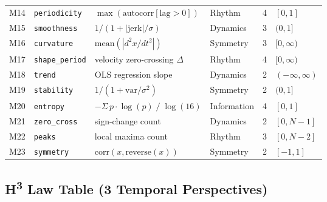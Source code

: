 \begin{longtable}{
  r
  l
  l
  l
  r
  l
}
\rowcolor{green!8}
M14 & \texttt{periodicity}    & $\max(\mathrm{autocorr}[\mathrm{lag}>0])$ & Rhythm       & 4 & $[0,1]$      \\

\rowcolor{orange!8}
M15 & \texttt{smoothness}     & $1/(1+|\mathrm{jerk}|/\sigma)$           & Dynamics     & 3 & $(0,1]$      \\

\rowcolor{blue!8}
M16 & \texttt{curvature}      & $\mathrm{mean}(|d^2x/dt^2|)$            & Symmetry     & 3 & $[0,\infty)$ \\

\rowcolor{green!8}
M17 & \texttt{shape\_period}  & velocity zero-crossing $\Delta$           & Rhythm       & 4 & $[0,\infty)$ \\

\rowcolor{orange!8}
M18 & \texttt{trend}          & OLS regression slope                      & Dynamics     & 2 & $(-\infty,\infty)$ \\

\rowcolor{blue!8}
M19 & \texttt{stability}      & $1/(1+\mathrm{var}/\sigma^2)$            & Symmetry     & 2 & $(0,1]$      \\

\rowcolor{magenta!8}
M20 & \texttt{entropy}        & $-\Sigma\, p \cdot \log(p)\;/\;\log(16)$ & Information  & 4 & $[0,1]$      \\

\rowcolor{orange!8}
M21 & \texttt{zero\_cross}    & sign-change count                         & Dynamics     & 2 & $[0, N{-}1]$ \\

\rowcolor{green!8}
M22 & \texttt{peaks}          & local maxima count                        & Rhythm       & 3 & $[0, N{-}2]$ \\

\rowcolor{blue!8}
M23 & \texttt{symmetry}       & $\mathrm{corr}(x, \mathrm{reverse}(x))$  & Symmetry     & 2 & $[-1,1]$     \\

\end{longtable}


\subsection{H\textsuperscript{3} Law Table (3 Temporal Perspectives)}
\label{tab:h3-law}

